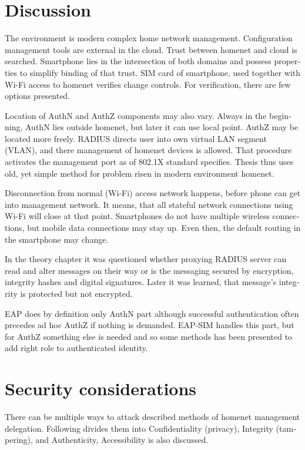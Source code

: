 \documentclass[12pt,a4paper,english]{tutthesis}
\begin{document}
\begin{otherlanguage}{english}
\section{Discussion}
\label{sec-6-4}

The environment is modern complex home network management.
Configuration management tools are 
external in the cloud. Trust between homenet and cloud is searched.
Smartphone lies in the intersection of both domains 
and possess properties to simplify binding of that trust.
SIM card of smartphone, used together with Wi-Fi access to homenet 
verifies change controls. For verification, there are few options presented.

Location of AuthN and AuthZ components may also vary.
Always in the beginning, AuthN lies outside homenet, but
later it can use local point. AuthZ may be located more freely.
RADIUS directs user into own virtual LAN segment (VLAN),
and there management of homenet devices is allowed.
That procedure activates the management port as of 802.1X standard
specifies.
Thesis thus uses old, yet simple method for problem risen in modern environment homenet.

Disconnection from normal (Wi-Fi) access network happens, before phone can get
into management network. It means, that all stateful network
connections using Wi-Fi will close at that point. Smartphones do not
have multiple wireless connections, but mobile data connections may 
stay up. Even then, the default routing in the smartphone may change.

In the theory chapter it was questioned whether proxying RADIUS server
can read and alter messages on their way or is the messaging secured
by encryption, integrity hashes and digital signatures.
Later it was learned, that message's integrity is protected but not encrypted.

EAP does by definition only AuthN part although successful
authentication often precedes ad hoc AuthZ if nothing is demanded.
EAP-SIM handles this part, but for AuthZ something else is needed
and so some methods has been presented to add right role to 
authenticated identity.
\section{Security considerations}
\label{sec-6-5}



There can be multiple ways to attack described methods of
homenet management delegation. Following divides them into
Confidentiality (privacy), Integrity (tampering), and
Authenticity, Accessibility is also discussed.



\end{otherlanguage}
\end{document}
